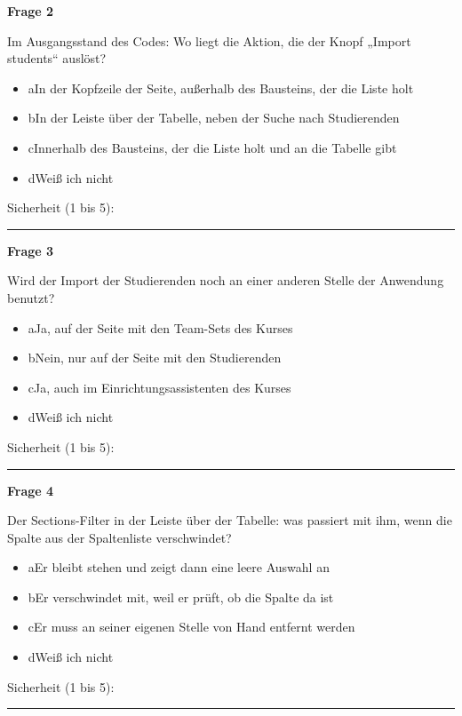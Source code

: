 \medskip

\noindent\begin{minipage}{\linewidth}
\textbf{Frage 2}\par
Im Ausgangsstand des Codes: Wo liegt die Aktion, die der Knopf „Import students“ auslöst?

\begin{itemize}[nosep,leftmargin=2.4em]
\item[\kreuz] a\quad In der Kopfzeile der Seite, außerhalb des Bausteins, der die Liste holt
\item[\kreuz] b\quad In der Leiste über der Tabelle, neben der Suche nach Studierenden
\item[\kreuz] c\quad Innerhalb des Bausteins, der die Liste holt und an die Tabelle gibt
\item[\kreuz] d\quad Weiß ich nicht
\end{itemize}
\noindent Sicherheit (1 bis 5):~\rule{2.5em}{0.4pt}\par
\end{minipage}

\medskip

\noindent\begin{minipage}{\linewidth}
\textbf{Frage 3}\par
Wird der Import der Studierenden noch an einer anderen Stelle der Anwendung benutzt?

\begin{itemize}[nosep,leftmargin=2.4em]
\item[\kreuz] a\quad Ja, auf der Seite mit den Team-Sets des Kurses
\item[\kreuz] b\quad Nein, nur auf der Seite mit den Studierenden
\item[\kreuz] c\quad Ja, auch im Einrichtungsassistenten des Kurses
\item[\kreuz] d\quad Weiß ich nicht
\end{itemize}
\noindent Sicherheit (1 bis 5):~\rule{2.5em}{0.4pt}\par
\end{minipage}

\medskip

\noindent\begin{minipage}{\linewidth}
\textbf{Frage 4}\par
Der Sections-Filter in der Leiste über der Tabelle: was passiert mit ihm, wenn die Spalte aus der Spaltenliste verschwindet?

\begin{itemize}[nosep,leftmargin=2.4em]
\item[\kreuz] a\quad Er bleibt stehen und zeigt dann eine leere Auswahl an
\item[\kreuz] b\quad Er verschwindet mit, weil er prüft, ob die Spalte da ist
\item[\kreuz] c\quad Er muss an seiner eigenen Stelle von Hand entfernt werden
\item[\kreuz] d\quad Weiß ich nicht
\end{itemize}
\noindent Sicherheit (1 bis 5):~\rule{2.5em}{0.4pt}\par
\end{minipage}

